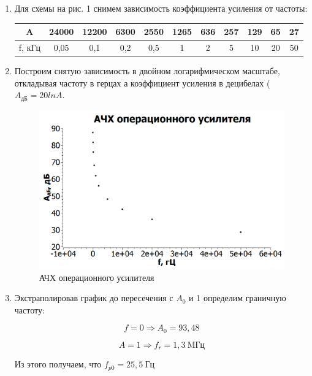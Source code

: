 \documentclass[a4paper, 12pt]{article}%
\begin{document}
\begin{enumerate}

\item Для схемы на рис. 1 снимем зависимость коэффициента усиления от частоты:

\begin{center}
\begin{tabular}{|c|c|c|c|c|c|c|c|c|c|c|}
\hline 
A & 24000 & 12200 & 6300 & 2550 & 1265 & 636 & 257 & 129 & 65 & 27 \\ 
\hline 
f, кГц & 0,05 & 0,1 & 0,2 & 0,5 & 1 & 2 & 5 & 10 & 20 & 50 \\ 
\hline 
\end{tabular} 
\end{center}

\item Построим снятую зависимость в двойном логарифмическом масштабе, откладывая частоту в герцах а коэффициент усиления в децибелах ($A_{\text{дБ}} = 20lnA$.

\begin{figure}[h!]
\centering
\includegraphics[scale=0.6]{images/graph_1.png}
\caption{АЧХ операционного усилителя}
\label{fig:graph_1}
\end{figure}

\item Экстраполировав график до пересечения с $A_0$ и 1 определим граничную частоту:

\[f = 0 \Rightarrow A_0 = 93,48\]

\[A = 1 \Rightarrow f_r = 1,3 \: \text{MГц}\]

Из этого получаем, что $f_{p0} = 25,5 \: \text{Гц}$

\end{enumerate}
\end{document}
